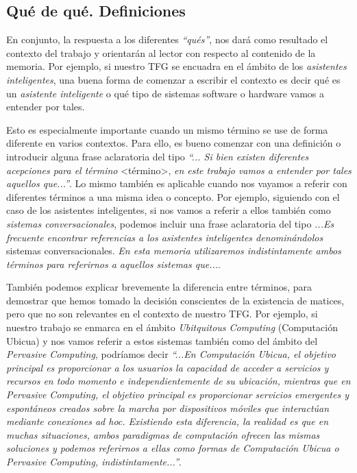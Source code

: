 \subsection{Qué de qué. Definiciones}

En conjunto, la respuesta a los diferentes \textit{``qués''}, nos dará como resultado el contexto del trabajo y orientarán al lector con respecto al contenido de la memoria. Por ejemplo, si nuestro TFG se encuadra en el ámbito de los \textit{asistentes inteligentes}, una buena forma de comenzar a escribir el contexto es decir qué es un \textit{asistente inteligente} o qué tipo de sistemas software o hardware vamos a entender por tales.

Esto es especialmente importante cuando un mismo término se use de forma diferente en varios contextos. Para ello, es bueno comenzar con una definición o introducir alguna frase aclaratoria del tipo \textit{``... Si bien existen diferentes acepciones para el término} \textless término\textgreater, \textit{en este trabajo vamos a entender por tales aquellos que...''}. Lo mismo también es aplicable cuando nos vayamos a referir con diferentes términos a una misma idea o concepto. Por ejemplo, siguiendo con el caso de los asistentes inteligentes, si nos vamos a referir a ellos también como \textit{sistemas conversacionales}, podemos incluir una frase aclaratoria del tipo \textit{...Es frecuente encontrar referencias a los asistentes inteligentes denominándolos } sistemas conversacionales. \textit{En esta memoria utilizaremos indistintamente ambos términos para referirnos a aquellos sistemas que...}.

También podemos explicar brevemente la diferencia entre términos, para demostrar que hemos tomado la decisión conscientes de la existencia de matices, pero que no son relevantes en el contexto de nuestro TFG. Por ejemplo, si nuestro trabajo se enmarca en el ámbito \textit{Ubitquitous Computing} (Computación Ubicua) y nos vamos referir a estos sistemas también como del ámbito del \textit{Pervasive Computing}, podríamos decir \textit{``...En Computación Ubicua, el objetivo principal es proporcionar a los usuarios la capacidad de acceder a servicios y recursos en todo momento e independientemente de su ubicación, mientras que en Pervasive Computing, el objetivo principal es proporcionar servicios emergentes y espontáneos creados sobre la marcha por dispositivos móviles que interactúan mediante conexiones ad hoc. Existiendo esta diferencia, la realidad es que en muchas situaciones, ambos paradigmas de computación ofrecen las mismas soluciones y podemos referirnos a ellas como formas de Computación Ubicua o Pervasive Computing, indistintamente...''}.


